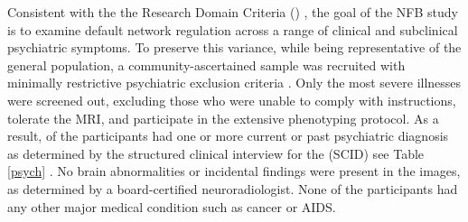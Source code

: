 Consistent with the the Research Domain Criteria (\DIFdelbegin {}\DIFdelend \DIFaddbegin {}\DIFaddend ) \cite{Insel2010}, the goal of the NFB study is to examine default network regulation across a range of clinical and subclinical psychiatric symptoms. To preserve this variance, while being representative of the general population, a community-ascertained sample was recruited with minimally restrictive psychiatric exclusion criteria \cite{Nooner2012}. Only the most severe illnesses were screened out, excluding those who were unable to comply with instructions, tolerate the MRI, and participate in the extensive phenotyping protocol. As a result, \DIFdelbegin {} \DIFdelbegin \DIFdel{) }\DIFdelend of the participants had one or more current or past psychiatric diagnosis as determined by the structured clinical interview for the \DIFdelbegin {}\DIFdelend \DIFaddbegin {}\DIFaddend (SCID) \cite{skid} \DIFdelbegin %
\DIFdelend \DIFaddbegin \DIFadd{(}\DIFaddend see Table \ref{psych}\DIFdelbegin %
\DIFdelend \DIFaddbegin \DIFadd{)}\DIFaddend . No brain abnormalities or incidental findings were present in the images, as determined by a board-certified neuroradiologist. None of the participants had any other major medical condition such as cancer or AIDS.
\DIFdelbegin {}\DIFdelend 

